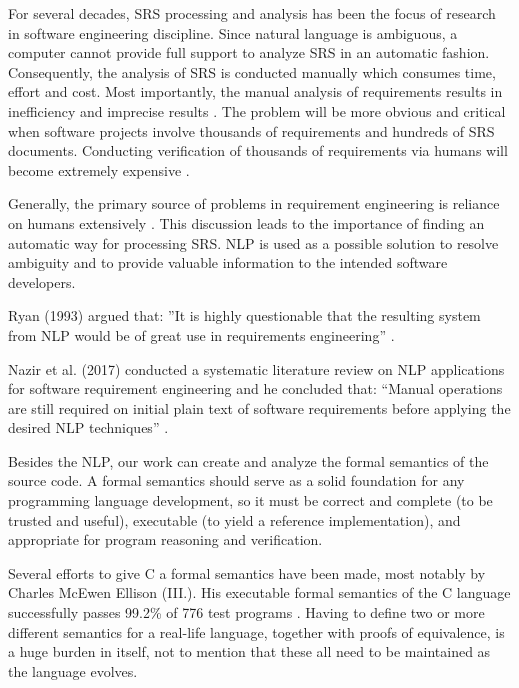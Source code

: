 \begin{multicols*}{2}
	For several decades, \gls{SRS} processing and analysis has been the focus of research in software engineering discipline. Since natural language is ambiguous, a computer cannot provide full support to analyze \gls{SRS} in an automatic fashion. Consequently, the analysis of \gls{SRS} is conducted manually which consumes time, effort and cost. Most importantly, the manual analysis of requirements results in inefficiency and imprecise results \cite{Wang}. The problem will be more obvious and critical when software projects involve thousands of requirements and hundreds of \gls{SRS} documents. Conducting verification of thousands of requirements via humans will become extremely expensive \cite{Fanmuy}.
	
	Generally, the primary source of problems in requirement engineering is reliance on humans extensively \cite{Ahmed}. This discussion leads to the importance of finding an automatic way for processing \gls{SRS}. \gls{NLP} is used as a possible solution to resolve ambiguity and to provide valuable information to the intended software developers.
	
	Ryan (1993) argued that: ”It is highly questionable that the resulting system from \gls{NLP} would be of great use in requirements engineering” \cite{Ryan}.
	
	Nazir et al. (2017) conducted a systematic literature review on \gls{NLP} applications for software requirement engineering and he concluded that: “Manual operations are still required on initial plain text of software requirements before applying the desired \gls{NLP} techniques” \cite{Nazir}.
	
	Besides the \gls{NLP}, our work can create and analyze the formal semantics of the source code.  A formal semantics should serve as a solid foundation for any programming language development, so it must be correct and complete (to be trusted and useful), executable (to yield a reference implementation), and appropriate for program reasoning and verification.
	
	Several efforts to give C a formal semantics have been made, most notably by Charles McEwen Ellison (III.). His executable formal semantics of the C language successfully passes  99.2\% of 776 test programs \cite{Ellison:2012:EFS:2103621.2103719}. Having to define two or more different semantics for a real-life language, together with proofs of equivalence, is a huge burden in itself, not to mention that these all need to be maintained as the language evolves.
	
\end{multicols*}

